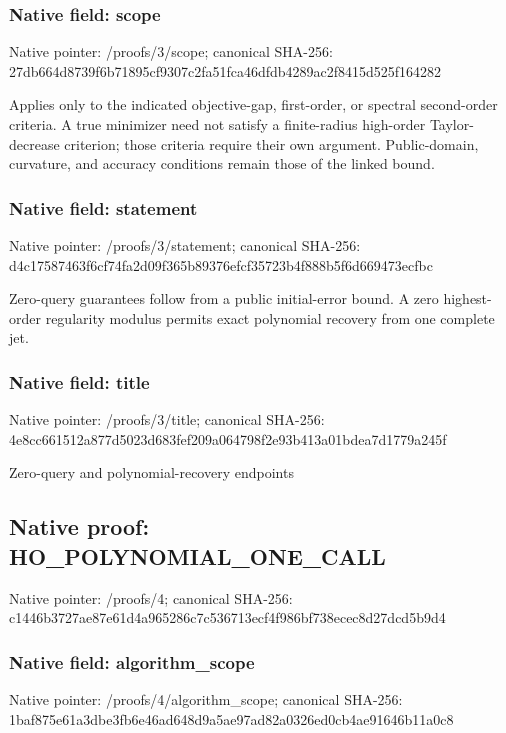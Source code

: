 \documentclass[10pt,a4paper]{article}
\begin{document}
\subsubsection{Native field: scope}
Native pointer: /proofs/3/scope; canonical SHA-256: 27db664d8739f6b71895cf9307c2fa51fca46dfdb4289ac2f8415d525f164282

\begingroup\raggedright\sloppy Applies only to the indicated objective-gap,\allowbreak{} first-order,\allowbreak{} or spectral second-order criteria. A true minimizer need not satisfy a finite-radius high-order Taylor-decrease criterion;\allowbreak{} those criteria require their own argument. Public-domain,\allowbreak{} curvature,\allowbreak{} and accuracy conditions remain those of the linked bound.\par\endgroup

\subsubsection{Native field: statement}
Native pointer: /proofs/3/statement; canonical SHA-256: d4c17587463f6cf74fa2d09f365b89376efcf35723b4f888b5f6d669473ecfbc

\begingroup\raggedright\sloppy Zero-query guarantees follow from a public initial-error bound. A zero highest-order regularity modulus permits exact polynomial recovery from one complete jet.\par\endgroup

\subsubsection{Native field: title}
Native pointer: /proofs/3/title; canonical SHA-256: 4e8cc661512a877d5023d683fef209a064798f2e93b413a01bdea7d1779a245f

\begingroup\raggedright\sloppy Zero-query and polynomial-recovery endpoints\par\endgroup

\subsection{Native proof: HO\_\allowbreak{}POLYNOMIAL\_\allowbreak{}ONE\_\allowbreak{}CALL}
Native pointer: /proofs/4; canonical SHA-256: c1446b3727ae87e61d4a965286c7c536713ecf4f986bf738ecec8d27dcd5b9d4

\subsubsection{Native field: algorithm\_\allowbreak{}scope}
Native pointer: /proofs/4/algorithm\_\allowbreak{}scope; canonical SHA-256: 1baf875e61a3dbe3fb6e46ad648d9a5ae97ad82a0326ed0cb4ae91646b11a0c8
\end{document}
